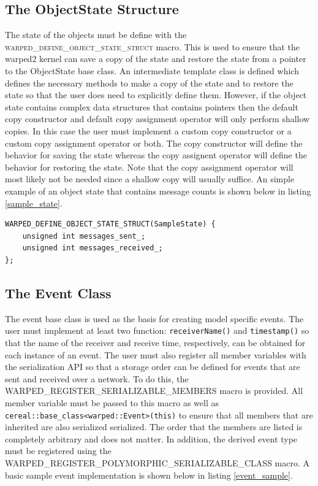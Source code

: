 \documentclass[11pt]{book}
\begin{document}
\subsection{The ObjectState Structure}

The state of the objects must be define with the \textsc{warped\_define\_object\_state\_struct} macro. This
is used to ensure that the warped2 kernel can save a copy of the state and restore the state from
a pointer to the ObjectState base class. An intermediate template class is defined which defines
the necessary methods to make a copy of the state and to restore the state so that the user does
need to explicitly define them. However, if the object state contains complex data structures
that contains pointers then the default copy constructor and default copy assignment operator will
only perform shallow copies. In this case the user must implement a custom copy constructor
or a custom copy assignment operator or both. The copy constructor will define the behavior for
saving the state whereas the copy assignent operator will define the behavior for restoring the
state. Note that the copy assignment operator will most likely not be needed since a shallow copy
will usually suffice. An simple example of an object state that contains message counts is shown
below in listing \ref{sample_state}.

\begin{lstlisting}[caption=Sample \textsc{warped2} State Definition, label=sample_state, float]
WARPED_DEFINE_OBJECT_STATE_STRUCT(SampleState) {
    unsigned int messages_sent_;
    unsigned int messages_received_;
};
\end{lstlisting}

\subsection{The Event Class}

The event base class is used as the basis for creating model specific events. The user must implement
at least two function: \texttt{receiverName()} and \texttt{timestamp()} so that the name of the
receiver and receive time, respectively, can be obtained for each instance of an event. The user
must also register all member variables with the serialization API so that a storage order can be
defined for events that are sent and received over a network. To do this, the
WARPED\_REGISTER\_SERIALIZABLE\_MEMBERS macro is provided. All member variable must be passed to this
macro as well as \texttt{cereal::base\_class<warped::Event>(this)} to ensure that all members that
are inherited are also serialized serialized. The order that the members are listed is completely
arbitrary and does not matter. In addition, the derived event type must be registered using the
WARPED\_REGISTER\_POLYMORPHIC\_SERIALIZABLE\_CLASS macro. A basic sample event implementation is
shown below in listing \ref{event_sample}.
\end{document}
